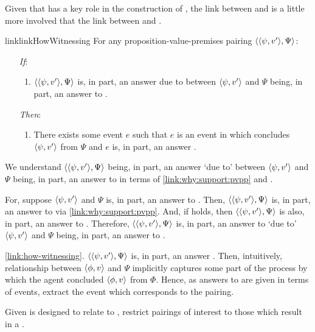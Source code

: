 \begin{note}
  Given that \qWhyVnP{} has a key role in the construction of \qHowV{}, the link between \qHow{} and \qWhyV{} is a little more involved that the link between \qWhyVnP{} and \qWhy{}.

  \begin{restatable}{link}{linkHowWitnessing}
    \label{link:how-witnessing}
    For any proposition-value-premises pairing \(\langle \langle \psi, v' \rangle, \Psi \rangle\):
    \begin{itemize}
    \item[\emph{If}:]
      \begin{enumerate}[label=\alph*., ref=(\alph*)]
      \item
        \(\langle \langle \psi, v' \rangle, \Psi \rangle\) is, in part, an answer \qHow{} due to \ros{} between \(\langle \psi, v' \rangle\) and \(\Psi\) being, in part, an answer to \qWhyVnP{}.
      \end{enumerate}
    \item[\emph{Then}:]
      \begin{enumerate}[label=\alph*., ref=(\alph*), resume]
      \item
        There exists some event \(e\) such that \(e\) is an event in which \vAgent{} concludes \(\langle \psi, v' \rangle\) from \(\Psi\) and \(e\) is, in part, an answer \qHowV{}.
      \end{enumerate}
    \end{itemize}
    \vspace{-\baselineskip}
  \end{restatable}

  We understand  \(\langle \langle \psi, v' \rangle, \Psi \rangle\) being, in part, an answer \qHow{} `due to' \ros{} between \(\langle \psi, v' \rangle\) and \(\Psi\) being, in part, an answer to \qWhyVnP{} in terms of \autoref{link:why:support:pvpp} and \issueInclusion{}.

  For, suppose \(\langle \psi, v' \rangle\) and \(\Psi\) is, in part, an answer to \qWhyVnP{}.
  Then, \(\langle \langle \psi, v' \rangle, \Psi \rangle\) is, in part, an answer to \qWhy{} via \autoref{link:why:support:pvpp}.
  And, if \issueInclusion{} holds, then \(\langle \langle \psi, v' \rangle, \Psi \rangle\) is also, in part, an answer to \qHow{}.
  Therefore, \(\langle \langle \psi, v' \rangle, \Psi \rangle\) is, in part, an answer to \qHow{} `due to' \(\langle \psi, v' \rangle\) and \(\Psi\) being, in part, an answer to \qWhyVnP{}.
\end{note}

\begin{note}
  \autoref{link:how-witnessing}.
  \(\langle \langle \psi, v' \rangle, \Psi \rangle\) is, in part, an answer \qHow{}.
  Then, intuitively, relationship between \(\langle \phi, v \rangle\) and \(\Psi\) implicitly captures some part of the process by which the agent concluded \(\langle \phi, v \rangle\) from \(\Phi\).
  Hence, as answers to \qHowV{} are given in terms of events, extract the event which corresponds to the pairing.

  Given \qHowV{} is designed to relate to \qWhyVnP{}, restrict pairings of interest to those which result in a .
\end{note}

